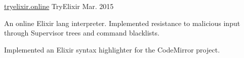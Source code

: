 

\begin{cventries}

  \cventry
    {\href{http://tryelixir.online}{tryelixir.online}} %
    {TryElixir} %
    {} %
    {Mar. 2015} %
    {
      \begin{cvitems} %
        \item An online Elixir lang interpreter. Implemented resistance to malicious
        input through Supervisor trees and command blacklists.
        \item Implemented an Elixir syntax highlighter for the CodeMirror project.
      \end{cvitems}
    }

\end{cventries}
